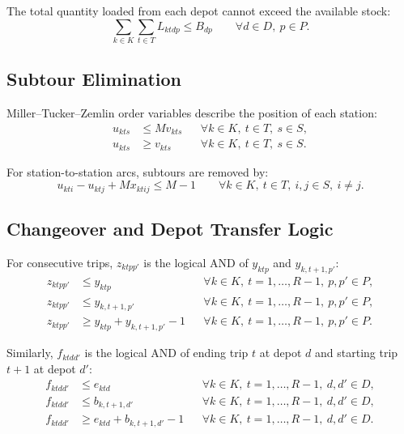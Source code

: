 \documentclass[11pt,a4paper]{article}
\begin{document}
The total quantity loaded from each depot cannot exceed the available stock:
\begin{equation}
    \sum_{k \in K}\sum_{t \in T} L_{ktdp}
    \leq B_{dp}
    \qquad \forall d \in D,\ p \in P.
\label{eq:stock}
\end{equation}

\subsection{Subtour Elimination}

Miller--Tucker--Zemlin order variables describe the position of each station:
\begin{align}
    u_{kts} &\leq M v_{kts}
        && \forall k \in K,\ t \in T,\ s \in S, \label{eq:order-upper}\\
    u_{kts} &\geq v_{kts}
        && \forall k \in K,\ t \in T,\ s \in S. \label{eq:order-lower}
\end{align}

For station-to-station arcs, subtours are removed by:
\begin{equation}
    u_{kti} - u_{ktj} + M x_{ktij} \leq M - 1
    \qquad
    \forall k \in K,\ t \in T,\ i,j \in S,\ i\neq j.
\label{eq:mtz}
\end{equation}

\subsection{Changeover and Depot Transfer Logic}

For consecutive trips, \(z_{ktpp'}\) is the logical AND of \(y_{ktp}\) and
\(y_{k,t+1,p'}\):
\begin{align}
    z_{ktpp'} &\leq y_{ktp}
        && \forall k \in K,\ t=1,\ldots,R-1,\ p,p' \in P, \label{eq:change-prev}\\
    z_{ktpp'} &\leq y_{k,t+1,p'}
        && \forall k \in K,\ t=1,\ldots,R-1,\ p,p' \in P, \label{eq:change-next}\\
    z_{ktpp'} &\geq y_{ktp}+y_{k,t+1,p'}-1
        && \forall k \in K,\ t=1,\ldots,R-1,\ p,p' \in P. \label{eq:change-and}
\end{align}

Similarly, \(f_{ktdd'}\) is the logical AND of ending trip \(t\) at depot \(d\)
and starting trip \(t+1\) at depot \(d'\):
\begin{align}
    f_{ktdd'} &\leq e_{ktd}
        && \forall k \in K,\ t=1,\ldots,R-1,\ d,d' \in D, \label{eq:transfer-end}\\
    f_{ktdd'} &\leq b_{k,t+1,d'}
        && \forall k \in K,\ t=1,\ldots,R-1,\ d,d' \in D, \label{eq:transfer-start}\\
    f_{ktdd'} &\geq e_{ktd}+b_{k,t+1,d'}-1
        && \forall k \in K,\ t=1,\ldots,R-1,\ d,d' \in D. \label{eq:transfer-and}
\end{align}
\end{document}
